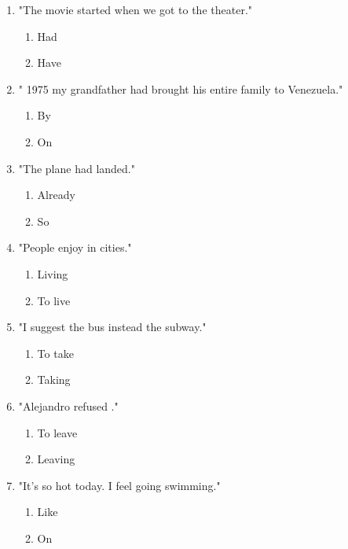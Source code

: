 \documentclass[11pt,a4paper]{article}
\begin{document}
\begin{enumerate}
    \item "The movie \underline{\hspace{2cm}} started when we got to the theater."
    \begin{enumerate}[label=\alph*.] \item Had \item Have \end{enumerate}

    \item "\underline{\hspace{2cm}} 1975 my grandfather had brought his entire family to Venezuela."
    \begin{enumerate}[label=\alph*.] \item By \item On \end{enumerate}

    \item "The plane had \underline{\hspace{2cm}} landed."
    \begin{enumerate}[label=\alph*.] \item Already \item So \end{enumerate}

    \item "People enjoy \underline{\hspace{2cm}} in cities."
    \begin{enumerate}[label=\alph*.] \item Living \item To live \end{enumerate}

    \item "I suggest \underline{\hspace{2cm}} the bus instead the subway."
    \begin{enumerate}[label=\alph*.] \item To take \item Taking \end{enumerate}

    \item "Alejandro refused \underline{\hspace{2cm}}."
    \begin{enumerate}[label=\alph*.] \item To leave \item Leaving \end{enumerate}

    \item "It's so hot today. I feel \underline{\hspace{2cm}} going swimming."
    \begin{enumerate}[label=\alph*.] \item Like \item On \end{enumerate}


\end{enumerate}
\end{document}
